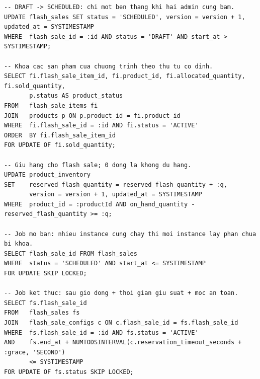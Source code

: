 \reportblockspace{72pt}
\begin{lstlisting}[language=OracleSQL, caption={Compare-and-set trạng thái, giữ hàng và job đổi trạng thái}, label={lst:cc-vong-doi}]
-- DRAFT -> SCHEDULED: chi mot ben thang khi hai admin cung bam.
UPDATE flash_sales SET status = 'SCHEDULED', version = version + 1, updated_at = SYSTIMESTAMP
WHERE  flash_sale_id = :id AND status = 'DRAFT' AND start_at > SYSTIMESTAMP;

-- Khoa cac san pham cua chuong trinh theo thu tu co dinh.
SELECT fi.flash_sale_item_id, fi.product_id, fi.allocated_quantity, fi.sold_quantity,
       p.status AS product_status
FROM   flash_sale_items fi
JOIN   products p ON p.product_id = fi.product_id
WHERE  fi.flash_sale_id = :id AND fi.status = 'ACTIVE'
ORDER  BY fi.flash_sale_item_id
FOR UPDATE OF fi.sold_quantity;

-- Giu hang cho flash sale; 0 dong la khong du hang.
UPDATE product_inventory
SET    reserved_flash_quantity = reserved_flash_quantity + :q,
       version = version + 1, updated_at = SYSTIMESTAMP
WHERE  product_id = :productId AND on_hand_quantity - reserved_flash_quantity >= :q;

-- Job mo ban: nhieu instance cung chay thi moi instance lay phan chua bi khoa.
SELECT flash_sale_id FROM flash_sales
WHERE  status = 'SCHEDULED' AND start_at <= SYSTIMESTAMP
FOR UPDATE SKIP LOCKED;

-- Job ket thuc: sau gio dong + thoi gian giu suat + moc an toan.
SELECT fs.flash_sale_id
FROM   flash_sales fs
JOIN   flash_sale_configs c ON c.flash_sale_id = fs.flash_sale_id
WHERE  fs.flash_sale_id = :id AND fs.status = 'ACTIVE'
AND    fs.end_at + NUMTODSINTERVAL(c.reservation_timeout_seconds + :grace, 'SECOND')
       <= SYSTIMESTAMP
FOR UPDATE OF fs.status SKIP LOCKED;
\end{lstlisting}

